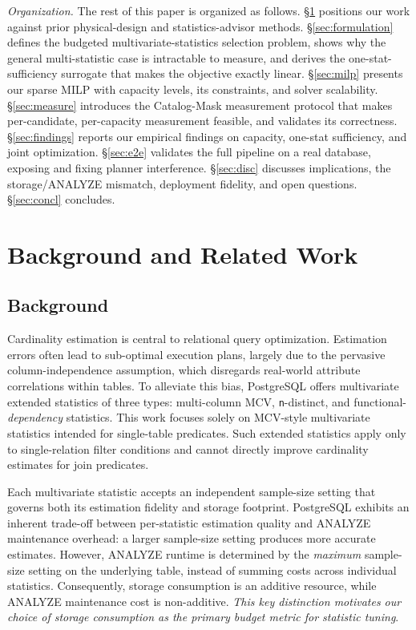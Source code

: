 \documentclass[sigconf, nonacm]{acmart}
\begin{document}
\emph{Organization.} The rest of this paper is organized as follows.
\S\ref{sec:back} positions our work against prior physical-design and
statistics-advisor methods. \S\ref{sec:formulation} defines the
budgeted multivariate-statistics selection problem, shows why the general
multi-statistic case is intractable to measure, and derives the
one-stat-sufficiency surrogate that makes the objective exactly linear.
\S\ref{sec:milp} presents our sparse MILP with capacity levels, its
constraints, and solver scalability. \S\ref{sec:measure} introduces the
Catalog-Mask measurement protocol that makes per-candidate, per-capacity
measurement feasible, and validates its correctness. \S\ref{sec:findings}
reports our empirical findings on capacity, one-stat sufficiency, and joint
optimization. \S\ref{sec:e2e} validates the full pipeline on a real database,
exposing and fixing planner interference. \S\ref{sec:disc} discusses
implications, the storage/ANALYZE mismatch, deployment fidelity, and open
questions. \S\ref{sec:concl} concludes.

\section{Background and Related Work}
\label{sec:back}

\subsection{Background}

Cardinality estimation is central to relational query optimization. Estimation
errors often lead to sub-optimal execution plans, largely due to the pervasive
column-independence assumption, which disregards real-world attribute
correlations within tables. To alleviate this bias, PostgreSQL offers
multivariate extended statistics of three types: multi-column MCV,
\texttt{n}-distinct, and functional-\emph{dependency} statistics. This work
focuses solely on MCV-style multivariate statistics intended for single-table
predicates. Such extended statistics apply only to single-relation filter
conditions and cannot directly improve cardinality estimates for join
predicates.

Each multivariate statistic accepts an independent sample-size setting that
governs both its estimation fidelity and storage footprint. PostgreSQL exhibits
an inherent trade-off between per-statistic estimation quality and ANALYZE
maintenance overhead: a larger sample-size setting produces more accurate
estimates. However, ANALYZE runtime is determined by the \emph{maximum}
sample-size setting on the underlying table, instead of summing costs across
individual statistics. Consequently, storage consumption is an additive
resource, while ANALYZE maintenance cost is non-additive.
\emph{This key distinction motivates our choice of storage consumption as the
primary budget metric for statistic tuning}.
\end{document}
